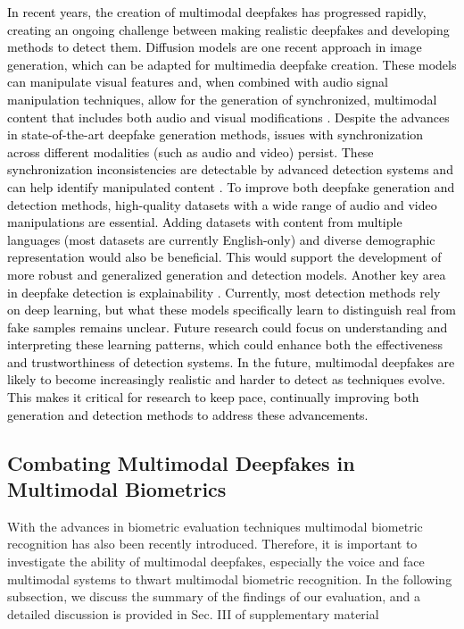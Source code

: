 \textcolor{black}{In recent years, the creation of multimodal deepfakes has progressed rapidly, creating an ongoing challenge between making realistic deepfakes and developing methods to detect them. Diffusion models are one recent approach in image generation, which can be adapted for multimedia deepfake creation. These models can manipulate visual features and, when combined with audio signal manipulation techniques, allow for the generation of synchronized, multimodal content that includes both audio and visual modifications \cite{du2024dfadd, firc2024diffuse, av2024latent, bhattacharyya2024diffusion}. Despite the advances in state-of-the-art deepfake generation methods, issues with synchronization across different modalities (such as audio and video) persist. These synchronization inconsistencies are detectable by advanced detection systems and can help identify manipulated content \cite{liz2024generation, ivanovska2024vulnerability, mubarak2023survey}. To improve both deepfake generation and detection methods, high-quality datasets with a wide range of audio and video manipulations are essential. Adding datasets with content from multiple languages (most datasets are currently English-only) and diverse demographic representation would also be beneficial. This would support the development of more robust and generalized generation and detection models. Another key area in deepfake detection is explainability \cite{haq2024multimodal, tsigos2024towards}. Currently, most detection methods rely on deep learning, but what these models specifically learn to distinguish real from fake samples remains unclear. Future research could focus on understanding and interpreting these learning patterns, which could enhance both the effectiveness and trustworthiness of detection systems. In the future, multimodal deepfakes are likely to become increasingly realistic and harder to detect as techniques evolve. This makes it critical for research to keep pace, continually improving both generation and detection methods to address these advancements.}


\subsection{Combating Multimodal Deepfakes in Multimodal Biometrics}
\label{subsec:multimodal_biometrics}
With the advances in biometric evaluation techniques multimodal biometric recognition has also been recently introduced. Therefore, it is important to investigate the ability of multimodal deepfakes, especially the voice and face multimodal systems to thwart multimodal biometric recognition. In the following subsection, we discuss the summary of the findings of our evaluation, and a detailed discussion is provided in Sec. III of supplementary material
